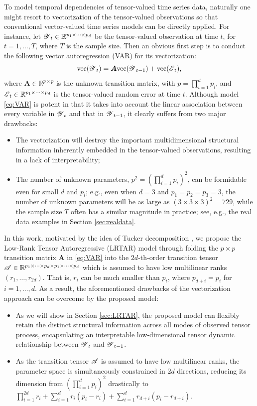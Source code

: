 \documentclass[12pt]{article}
\newcommand{\bm}{\boldsymbol}
\newcommand{\cm}[1]{\mbox{\boldmath$\mathscr{#1}$}}
\begin{document}
To model temporal dependencies of tensor-valued time series data, naturally one might resort to vectorization of the tensor-valued observations so that conventional vector-valued time series models can be directly applied. For instance, let $\cm{Y}_t\in\mathbb{R}^{p_1\times\cdots\times p_d}$ be the tensor-valued observation at time $t$, for $t=1,\dots, T$, where $T$ is the sample size. Then an obvious first step is to conduct the following vector autoregression (VAR) for its vectorization:
\begin{equation}
\label{eq:VAR}
\text{vec}(\cm{Y}_t)=\bm{A}\text{vec}(\cm{Y}_{t-1})+\text{vec}(\cm{E}_t),
\end{equation}
where $\bm{A}\in\mathbb{R}^{p\times p}$ is the unknown transition matrix, with $p=\prod_{i=1}^dp_i$, and $\cm{E}_t \in\mathbb{R}^{p_1\times\cdots\times p_d}$ is the tensor-valued random error at time $t$. Although model \eqref{eq:VAR} is potent in that it takes into account  the linear association between every variable in $\cm{Y}_t$ and that in $\cm{Y}_{t-1}$, it clearly suffers from two major drawbacks:
\begin{itemize}
	\item The vectorization will destroy the  important multidimensional  structural information inherently embedded in the tensor-valued observations, resulting in a lack of interpretability;
	\item The number of unknown parameters, $p^2=(\prod_{i=1}^dp_i)^2$, can be formidable even for small $d$ and $p_i$; e.g., even when $d=3$ and $p_1=p_2=p_3=3$, the number of unknown parameters will be as large as  $(3\times 3\times 3)^2=729$, while the sample size $T$  often has a similar magnitude in practice; see, e.g., the real data examples in Section \ref{sec:realdata}.
\end{itemize}

In this work, motivated by the idea of Tucker  decomposition \citep{tucker1966some}, we  propose the Low-Rank Tensor Autoregressive (LRTAR) model through folding the $p\times p$ transition matrix $\bm{A}$ in \eqref{eq:VAR} into the $2d$-th-order transition tensor $\cm{A}\in\mathbb{R}^{p_1\times\cdots\times p_d\times p_1\times\cdots\times p_d}$ which is assumed to have  low multilinear ranks $(r_1,\dots, r_{2d})$. That is, $r_i$ can be much smaller than $p_i$, where $p_{d+i}=p_i$ for $i=1,\dots, d$.  As a result, the aforementioned drawbacks of the vectorization approach can be overcome by the proposed model:
\begin{itemize}
	\item As we will show in Section \ref{sec:LRTAR}, the proposed model can flexibly retain the distinct structural information  across all modes of observed tensor process,  encapsulating an interpretable low-dimensional tensor dynamic relationship between $\cm{Y}_t$ and $\cm{Y}_{t-1}$.
	
	\item As the transition tensor $\cm{A}$ is assumed to have low multilinear ranks,  the parameter space is simultaneously constrained in $2d$ directions, reducing its dimension from $(\prod_{i=1}^dp_i)^2$ drastically to $\prod_{i=1}^{2d}r_i+\sum_{i=1}^dr_i(p_i-r_i)+\sum_{i=1}^dr_{d+i}(p_i-r_{d+i})$.
\end{itemize}
\end{document}
